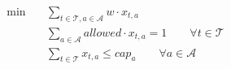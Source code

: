 \begin{align}
  \min\quad & \sum_{t \in \mathcal{T}, a \in \mathcal{A}} w \cdot x_{t,a} \tag{total_delay} \\
  & \sum_{a \in \mathcal{A}} allowed \cdot x_{t,a} = 1 \qquad \forall t \in \mathcal{T} \tag{assign} \\
  & \sum_{t \in \mathcal{T}} x_{t,a} \le cap_a \qquad \forall a \in \mathcal{A} \tag{capacity}
\end{align}